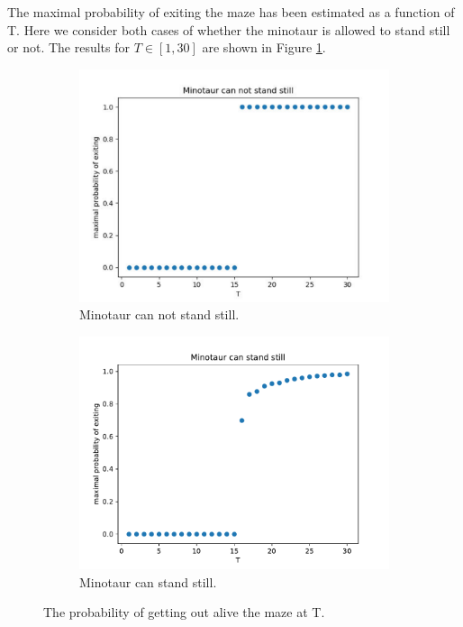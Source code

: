 \documentclass{article}
\begin{document}
The maximal probability of exiting the maze has been estimated as a function of T. Here we consider both cases of whether the minotaur is allowed to stand still or not.
The results for $T\in [1,30]$ are shown in Figure \ref{fig:prob-getout-alive}.
\begin{figure}[H]
  \centering
  \begin{subfigure}{.5\textwidth}
    \centering
    \includegraphics[width=.9\linewidth]{no_stand_still.pdf}
    \caption{Minotaur can not stand still.}
  \end{subfigure}%
  \begin{subfigure}{.5\textwidth}
    \centering
    \includegraphics[width=.9\linewidth]{stand_still.pdf}
    \caption{Minotaur can stand still.}
  \end{subfigure}
  \caption{The probability of getting out alive the maze at T.}
  \label{fig:prob-getout-alive}
\end{figure}
\end{document}
